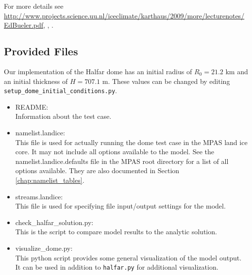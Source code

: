 For more details see \url{http://www.projects.science.uu.nl/iceclimate/karthaus/2009/more/lecturenotes/EdBueler.pdf},  \citet{bueler2005}, \citet{Halfar1983}.



\subsection{Provided Files}
\label{subsec:halfar_files}
Our implementation of the Halfar dome has an initial radius of $R_0=21.2$ km and an initial thickness of $H=707.1$ m.
These values can be changed by editing \texttt{setup\_dome\_initial\_conditions.py}.

\begin{itemize}
	\item README: \\
		Information about the test case.

	\item namelist.landice: \\
		This file is used for actually running the dome test case in the MPAS land ice core.  It may not include all options available to the model.  See the namelist.landice.defaults file in the MPAS root directory for a list of all options available.  They are also documented in Section \ref{chap:namelist_tables}.

	\item streams.landice: \\
		This file is used for specifying file input/output settings for the model.

	\item check\_halfar\_solution.py: \\
		This is the script to compare model results to the analytic solution.

	\item visualize\_dome.py: \\
		This python script provides some general visualization of the model output.
		It can be used in addition to \texttt{halfar.py} for additional visualization.



\end{itemize}
